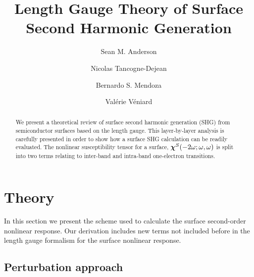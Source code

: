 \documentclass[floatfix,prb,aps,superscriptaddress,11pt,preprint,letterpaper]{revtex4}
\begin{document}
\title{Length Gauge Theory of Surface Second Harmonic Generation}
\author{Sean M. Anderson}
\author{Nicolas Tancogne-Dejean}
\author{Bernardo S. Mendoza}
\author{Val\'erie V\'eniard}

\begin{abstract}
We present a theoretical review of surface second harmonic generation (SHG) 
from semiconductor surfaces based on the {\color{red} length} gauge. This 
layer-by-layer analysis is carefully presented in order to show how a 
surface SHG calculation can be readily evaluated. The nonlinear susceptibility 
tensor for a surface, $\boldsymbol{\chi}^S(-2\omega;\omega,\omega)$
is split into two terms relating to inter-band 
and intra-band one-electron transitions. 

\end{abstract}  

\maketitle

\section{Theory}

\label{theory}

In this section we present the scheme used to calculate the surface second-order
nonlinear response.
Our derivation includes new terms not included
before in the length gauge formalism for the surface nonlinear
response. 

\subsection{Perturbation approach}
\end{document}
